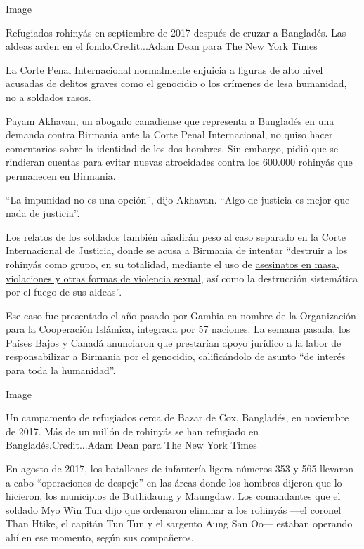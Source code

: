 Image

Refugiados rohinyás en septiembre de 2017 después de cruzar a Bangladés.
Las aldeas arden en el fondo.Credit...Adam Dean para The New York Times

La Corte Penal Internacional normalmente enjuicia a figuras de alto
nivel acusadas de delitos graves como el genocidio o los crímenes de
lesa humanidad, no a soldados rasos.

Payam Akhavan, un abogado canadiense que representa a Bangladés en una
demanda contra Birmania ante la Corte Penal Internacional, no quiso
hacer comentarios sobre la identidad de los dos hombres. Sin embargo,
pidió que se rindieran cuentas para evitar nuevas atrocidades contra los
600.000 rohinyás que permanecen en Birmania.

``La impunidad no es una opción'', dijo Akhavan. ``Algo de justicia es
mejor que nada de justicia''.

Los relatos de los soldados también añadirán peso al caso separado en la
Corte Internacional de Justicia, donde se acusa a Birmania de intentar
``destruir a los rohinyás como grupo, en su totalidad, mediante el uso
de
\href{https://www.nytimes3xbfgragh.onion/2017/09/02/world/asia/rohingya-myanmar-bangladesh-refugees-massacre.html?action=click\&module=RelatedCoverage\&pgtype=Article\&region=Footer}{asesinatos
en masa, violaciones y otras formas de violencia sexual}, así como la
destrucción sistemática por el fuego de sus aldeas''.

Ese caso fue presentado el año pasado por Gambia en nombre de la
Organización para la Cooperación Islámica, integrada por 57 naciones. La
semana pasada, los Países Bajos y Canadá anunciaron que prestarían apoyo
jurídico a la labor de responsabilizar a Birmania por el genocidio,
calificándolo de asunto ``de interés para toda la humanidad''.

Image

Un campamento de refugiados cerca de Bazar de Cox, Bangladés, en
noviembre de 2017. Más de un millón de rohinyás se han refugiado en
Bangladés.Credit...Adam Dean para The New York Times

En agosto de 2017, los batallones de infantería ligera números 353 y 565
llevaron a cabo ``operaciones de despeje'' en las áreas donde los
hombres dijeron que lo hicieron, los municipios de Buthidaung y
Maungdaw. Los comandantes que el soldado Myo Win Tun dijo que ordenaron
eliminar a los rohinyás ---el coronel Than Htike, el capitán Tun Tun y
el sargento Aung San Oo--- estaban operando ahí en ese momento, según
sus compañeros.

